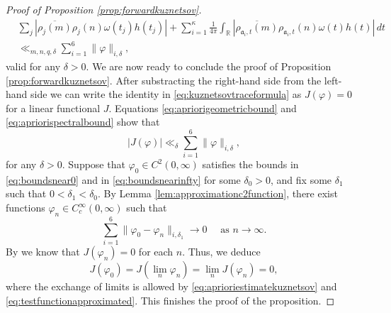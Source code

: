 \documentclass{article}
\theoremstyle{named}
\newcommand{\R}{\mathbb{R}}
\renewcommand{\a}{\mathfrak{a}}
\begin{document}
\begin{proof}[Proof of Proposition \ref{prop:forwardkuznetsov}]
\begin{equation}\label{eq:apriorispectralbound}
\begin{aligned}
& \sum_j \left|\overline{\rho_j(m)} \rho_j(n) \omega(t_j)h(t_j)\right| + \sum_{i = 1}^\kappa\frac{1}{4\pi}\int_\R \left|\overline{\rho_{\a_i, t}(m)}\rho_{\a_i, t}(n) \omega(t)h(t)\right| \, dt\\
&  \ll_{m, n, q, \delta} \sum_{i = 1}^6 \|\varphi\|_{i, \delta},
\end{aligned}
\end{equation}
valid for any $\delta > 0$. We are now ready to conclude the proof of Proposition \ref{prop:forwardkuznetsov}. After substracting the right-hand side from the left-hand side we can write the identity in \eqref{eq:kuznetsovtraceformula} as $J(\varphi) = 0$ for a linear functional $J$. Equations \eqref{eq:apriorigeometricbound} and \eqref{eq:apriorispectralbound} show that 
\begin{equation}\label{eq:aprioriestimatekuznetsov}
    |J(\varphi)| \ll_{\delta} \sum_{i = 1}^6 \|\varphi\|_{i, \delta},
\end{equation}
for any $\delta> 0$. Suppose that $\varphi_0 \in C^2(0, \infty)$ satisfies the bounds in \eqref{eq:boundsnear0} and in \eqref{eq:boundsnearinfty} for some $\delta_0 > 0$, and fix some $\delta_1$ such that $0< \delta_1 < \delta_0$. By Lemma \ref{lem:approximationc2function}, there exist functions $\varphi_n \in C_c^\infty(0, \infty)$ such that 
\begin{equation}\label{eq:testfunctionapproximated}
    \sum_{i = 1}^6 \|\varphi_0 - \varphi_n\|_{i, \delta_1} \to 0 \quad \text{ as }n \to \infty.
\end{equation}
By \cite[Equation (84)]{proskurinarbitraryweightkuznetsov} we know that $J(\varphi_n) = 0$ for each $n$. Thus, we deduce
\begin{equation*}
    J(\varphi_0) = J(\lim_n \varphi_n) = \lim_n J(\varphi_n) = 0,
\end{equation*}
where the exchange of limits is allowed by \eqref{eq:aprioriestimatekuznetsov} and \eqref{eq:testfunctionapproximated}. This finishes the proof of the proposition.
\end{proof}
\end{document}
